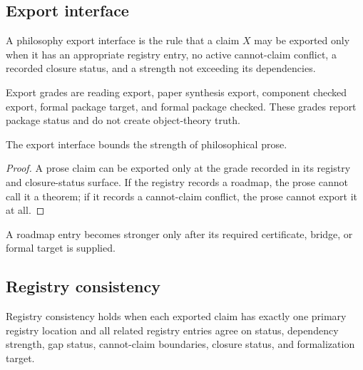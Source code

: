 \subsection{Export interface}
\label{subsec:philosophy-export-interface-layer}

\begin{definition}
\label{def:philosophy-export-interface-layer}
A philosophy export interface is the rule that a claim \(X\) may be
exported only when it has an appropriate registry entry, no active
cannot-claim conflict, a recorded closure status, and a strength not
exceeding its dependencies.
\end{definition}

\begin{definition}
\label{def:philosophy-export-grade-layer}
Export grades are reading export, paper synthesis export, component
checked export, formal package target, and formal package checked.
These grades report package status and do not create object-theory
truth.
\end{definition}

\begin{theorem}
\label{thm:philosophy-export-interface-bounds-prose}
The export interface bounds the strength of philosophical prose.
\end{theorem}
\begin{proof}
A prose claim can be exported only at the grade recorded in its
registry and closure-status surface. If the registry records a roadmap,
the prose cannot call it a theorem; if it records a cannot-claim
conflict, the prose cannot export it at all.
\end{proof}

\begin{corollary}
\label{cor:philosophy-roadmaps-stay-roadmaps}
A roadmap entry becomes stronger only after its required certificate,
bridge, or formal target is supplied.
\end{corollary}

\subsection{Registry consistency}
\label{subsec:philosophy-registry-consistency}

\begin{definition}
\label{def:philosophy-registry-consistency}
Registry consistency holds when each exported claim has exactly one
primary registry location and all related registry entries agree on
status, dependency strength, gap status, cannot-claim boundaries,
closure status, and formalization target.
\end{definition}

